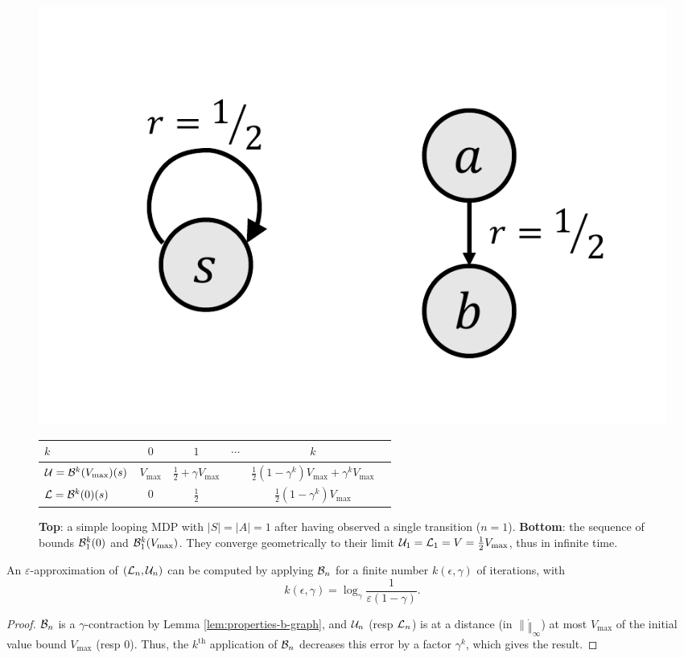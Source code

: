 \begin{subappendices}
\begin{figure}[th]
	\centering
	\includegraphics[trim=2.5cm 1cm 9cm 2cm, clip, width=0.1\linewidth]{img/gbop/loop.pdf}\\
	\begin{tabular}{lccccc}
		\toprule
		$k$ & $0$ & $1$ & $\cdots$ & $k$ \\
		\midrule
		$\mathcal{U} = \mathcal{B}^k(V_{\max})(s)$ & $V_{\max}$ & $\frac{1}{2} + \gamma V_{\max}$ && $\frac{1}{2}(1-\gamma^k)V_{\max} + \gamma^k V_{\max}$\\
		$\mathcal{L} = \mathcal{B}^k(0)(s)$ & $0$ & $\frac{1}{2}$ && $\frac{1}{2}(1-\gamma^k)V_{\max}$\\
		\bottomrule
	\end{tabular}
	\caption{\textbf{Top}: a simple looping MDP with $|S|=|A|=1$ after having observed a single transition ($n=1$). \textbf{Bottom}: the sequence of bounds $\mathcal{B}_1^k(0)$ and $\mathcal{B}_1^k(V_{\max})$. They converge geometrically to their limit $\mathcal{U}_1 = \mathcal{L}_1 = V = \frac{1}{2}V_{\max}$, thus in infinite time.}
	\label{fig:simple_loop}
\end{figure}

\begin{proposition}
	\begin{leftbar}[propositionbar]
	An $\varepsilon$-approximation of $(\mathcal{L}_n, \mathcal{U}_n)$ can be computed by applying $\mathcal{B}_n$ for a finite number $k(\epsilon,\gamma)$ of iterations, with $$k(\epsilon,\gamma) = \log_\gamma\frac{1}{\varepsilon(1-\gamma)}.$$ 
	\end{leftbar}
\end{proposition}
\begin{proof}
	$\mathcal{B}_n$ is a $\gamma$-contraction by Lemma \ref{lem:properties-b-graph}, and $\mathcal{U}_n$ (resp $\mathcal{L}_n$) is at a distance (in $\|\dot\|_\infty$) at most $V_{\max}$ of the initial value bound $V_{\max}$ (resp $0$). Thus, the $k^{\text{th}}$ application of $\mathcal{B}_n$ decreases this error by a factor $\gamma^k$, which gives the result.
	\end{proof}


\end{subappendices}
